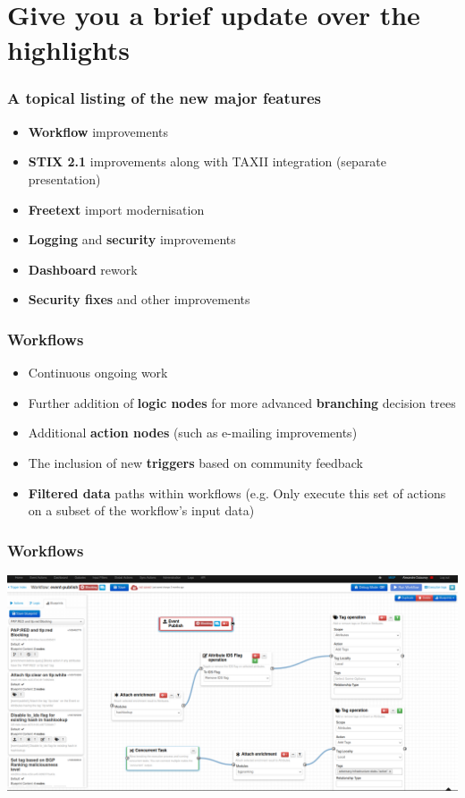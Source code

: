 \section{Give you a brief update over the highlights}

\begin{frame}
  \frametitle{A topical listing of the new major features}
  \begin{itemize}
      \item {\bf Workflow} improvements
      \item {\bf STIX 2.1} improvements along with TAXII integration (separate presentation)
      \item {\bf Freetext} import modernisation
      \item {\bf Logging} and {\bf security} improvements
      \item {\bf Dashboard} rework
      \item {\bf Security fixes} and other improvements
  \end{itemize}
\end{frame}


\begin{frame}
  \frametitle{Workflows}
  \begin{itemize}
     \item Continuous ongoing work
     \item Further addition of {\bf logic nodes} for more advanced {\bf branching} decision trees
     \item Additional {\bf action nodes} (such as e-mailing improvements)
     \item The inclusion of new {\bf triggers} based on community feedback
     \item {\bf Filtered data} paths within workflows (e.g. Only execute this set of actions on a subset of the workflow's input data)
  \end{itemize}
\end{frame}

\begin{frame}
\frametitle{Workflows}
\begin{center}
\includegraphics[scale=0.17]{images/workflows_filtered.png}
\end{center}
\end{frame}

